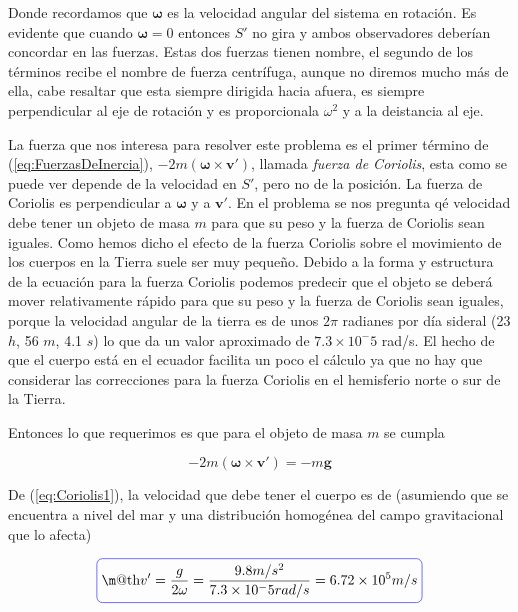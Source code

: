 \documentclass[a4paper,10pt]{article}
\makeatletter
\newcommand*{\boxcolor}{blue}
\renewcommand{\boxed}[1]{\textcolor{\boxcolor}{%
\tikz[baseline={([yshift=-1ex]current bounding box.center)}] \node [rectangle, minimum width=1ex,rounded corners,draw] {\normalcolor\m@th$\displaystyle#1$};}}
\makeatother
\begin{document}
Donde recordamos que $\mathbf{\omega}$ es la velocidad angular del sistema en rotación. Es evidente que cuando $\mathbf{\omega} = 0$
entonces $S'$ no gira y ambos observadores deberían concordar en las fuerzas. Estas dos fuerzas tienen nombre, el segundo de los términos
recibe el nombre de fuerza centrífuga, aunque no diremos mucho más de ella, cabe resaltar que esta siempre dirigida hacia
afuera, es siempre perpendicular al eje de rotación y es proporcionala $\omega^2$ y a la deistancia al eje.

\vspace{.3cm}

La fuerza que nos interesa para resolver este problema es el primer término de (\ref{eq:FuerzasDeInercia}), $- 2m(\mathbf{\omega} \times \mathbf{v'})$,
llamada \emph{fuerza de Coriolis}, esta como se puede ver depende de la velocidad en $S'$, pero no de la posición. La fuerza de Coriolis 
es perpendicular a $\mathbf{\omega}$ y a $\mathbf{v'}$. En el problema se nos pregunta qé velocidad debe tener un objeto de masa $m$ para que su peso 
y la fuerza de Coriolis sean iguales. Como hemos dicho el efecto de la fuerza Coriolis sobre el movimiento de los cuerpos en la Tierra 
suele ser muy pequeño. Debido a la forma y estructura de la ecuación para la fuerza Coriolis podemos predecir que el objeto se deberá mover 
relativamente rápido para que su peso y la fuerza de Coriolis sean iguales, porque la velocidad angular de la tierra es de unos $2\pi$ 
radianes por día sideral (23 $h$, 56 $m$, 4.1 $s$) lo que da un valor aproximado de $7.3 \times 10^-5$ rad/s. El hecho de que el
cuerpo está en el ecuador facilita un poco el cálculo ya que no hay que considerar las correcciones para la fuerza Coriolis en el
hemisferio norte o sur de la Tierra.

\vspace{.3cm}

Entonces lo que requerimos es que para el objeto de masa $m$ se cumpla

\begin{equation}
 - 2m(\mathbf{\omega} \times \mathbf{v'}) = - m \mathbf{g}
 \label{eq:Coriolis1}
\end{equation}

De (\ref{eq:Coriolis1}), la velocidad que debe tener el cuerpo es de (asumiendo que se encuentra a nivel del mar
y una distribución homogénea del campo gravitacional que lo afecta)

\begin{equation}
 \boxed{ v' = \frac{g}{2\omega} = \frac{9.8 m/s^2}{7.3 \times 10^-5 rad/s} = 6.72 \times 10^5 m/s}
\end{equation}
\end{document}
